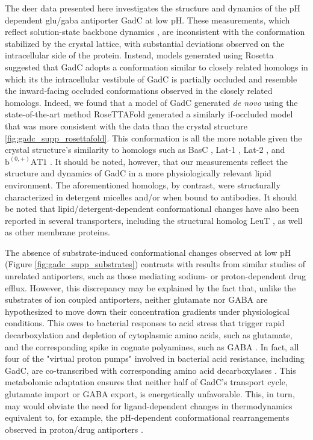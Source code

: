 The \gls{deer} data presented here investigates the structure and dynamics of the pH dependent \gls{glu}/\gls{gaba} antiporter GadC at low pH. These measurements, which reflect solution-state backbone dynamics \citep*{Jeschke2012, Kazmier2017}, are inconsistent with the conformation stabilized by the crystal lattice, with substantial deviations observed on the intracellular side of the protein. Instead, models generated using Rosetta suggested that GadC adopts a conformation similar to closely related homologs in which its the intracellular vestibule of GadC is partially occluded and resemble the inward-facing occluded conformations observed in the closely related homologs. Indeed, we found that a model of GadC generated \emph{de novo} using the state-of-the-art method RoseTTAFold \citep*{Baek2021} generated a similarly \gls{if}-occluded model that was more consistent with the data than the crystal structure \ref{fig:gadc_supp_rosettafold}. This conformation is all the more notable given the crystal structure's similarity to homologs such as BasC \citep*{Errasti-Murugarren2019}, Lat-1 \citep*{Lee2019, Yan2019}, Lat-2 \citep*{Yan2020}, and $\mathrm{b^{(0,+)}AT1}$ \citep*{Wu2020, Yan2020a}. It should be noted, however, that our measurements reflect the structure and dynamics of GadC in a more physiologically relevant lipid environment. The aforementioned homologs, by contrast, were structurally characterized in detergent micelles and/or when bound to antibodies. It should be noted that lipid/detergent-dependent conformational changes have also been reported in several transporters, including the structural homolog LeuT \citep*{Quick2009, Sohail2016}, as well as other membrane proteins. 

The absence of substrate-induced conformational changes observed at low pH (Figure \ref{fig:gadc_supp_substrates}) contrasts with results from similar studies of unrelated antiporters, such as those mediating sodium- or proton-dependent drug efflux. However, this discrepancy may be explained by the fact that, unlike the substrates of ion coupled antiporters, neither glutamate nor GABA are hypothesized to move down their concentration gradients under physiological conditions. This owes to bacterial responses to acid stress that trigger rapid decarboxylation and depletion of cytoplasmic amino acids, such as glutamate, and the corresponding spike in cognate polyamines, such as GABA \citep*{Foster2004, Richard2004}. In fact, all four of the "virtual proton pumps" involved in bacterial acid resistance, including GadC, are co-transcribed with corresponding amino acid decarboxylases \citep*{Kanjee2013}. This metabolomic adaptation ensures that neither half of GadC's transport cycle, glutamate import or GABA export, is energetically unfavorable. This, in turn, may would obviate the need for ligand-dependent changes in thermodynamics equivalent to, for example, the pH-dependent conformational rearrangements observed in proton/drug antiporters \citep*{Dastvan2016a, Jagessar2020, Masureel2014}.

